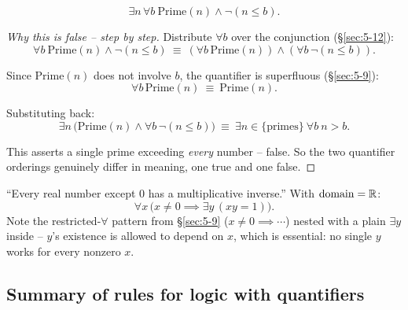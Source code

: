 \begin{example}
\[
\exists n\, \forall b\ \mathrm{Prime}(n) \wedge \neg(n \le b).
\]
\end{example}
\begin{proof}[Why this is false -- step by step]
Distribute $\forall b$ over the conjunction (\S\ref{sec:5-12}):
\[
\forall b\ \mathrm{Prime}(n) \wedge \neg(n\le b) \ \equiv\ (\forall b\, \mathrm{Prime}(n)) \wedge (\forall b\, \neg(n\le b)).
\]

Since $\mathrm{Prime}(n)$ does not involve $b$, the quantifier is superfluous (\S\ref{sec:5-9}):
\[
\forall b\, \mathrm{Prime}(n) \ \equiv\ \mathrm{Prime}(n).
\]

Substituting back:
\[
\exists n\,\big(\mathrm{Prime}(n) \wedge \forall b\,\neg(n\le b)\big) \ \equiv\ \exists n\in\{\text{primes}\}\ \forall b\ n>b.
\]

This asserts a single prime exceeding \emph{every} number -- false. So the two quantifier orderings genuinely differ in meaning, one true and one false.
\end{proof}

\bigskip
\begin{example}
``Every real number except $0$ has a multiplicative inverse.'' With $\mathrm{domain}=\mathbb{R}$:
\[
\forall x\,\big(x\neq 0 \implies \exists y\, (xy=1)\big).
\]
Note the restricted-$\forall$ pattern from \S\ref{sec:5-9} ($x\neq0 \implies \cdots$) nested with a plain $\exists y$ inside -- $y$'s existence is allowed to depend on $x$, which is essential: no single $y$ works for every nonzero $x$.
\end{example}

\subsection{Summary of rules for logic with quantifiers}
\label{sec:5-14}

